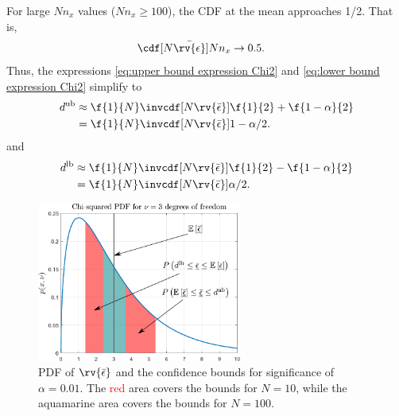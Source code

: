 \documentclass{simple-article}
\begin{document}
\begin{blackBox}
  For large $Nn_{x}$ values ($Nn_{x}\geq 100$), the CDF at the mean approaches 1/2. That is,
  \begin{align}
    \cdf[N\bar{\rv{\epsilon}}]{Nn_{x}}&\to 0.5.
  \end{align}
  Thus, the expressions \eqref{eq:upper bound expression Chi2} and \eqref{eq:lower bound expression Chi2} simplify to
  \begin{align}
    d^{\mathrm{ub}} 
            &\approx \f{1}{N}\invcdf[N\rv{\bar{\epsilon}}]{\f{1}{2} + \f{1-\alpha}{2}}\\
            &= \f{1}{N}\invcdf[N\rv{\bar{\epsilon}}]{1 - \alpha/2}.
  \end{align}
  and
  \begin{align}
    d^{\mathrm{lb}} 
            &\approx \f{1}{N}\invcdf[N\rv{\bar{\epsilon}}]{\f{1}{2} - \f{1-\alpha}{2}}\\
            &= \f{1}{N}\invcdf[N\rv{\bar{\epsilon}}]{\alpha/2}.
  \end{align}

  \begin{figure}[H]
    \centering
    \includegraphics[width=0.6\textwidth]{chi2pdf_edited_2areas.pdf}    
    \caption{PDF of $\rv{\bar{\epsilon}}$ and the confidence bounds for significance of $\alpha=0.01$. The \textcolor{red}{red} area covers the bounds for {$N=10$}, while the \textcolor[RGB]{0,225,225}{aquamarine} area covers the bounds for {$N=100$}.}
    \label{fig:chi2pdf_edited_2areas}
  \end{figure}     
\end{blackBox}
\end{document}
